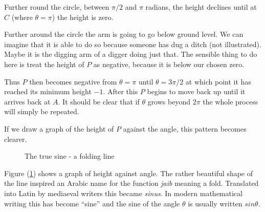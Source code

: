 \documentclass[main.tex]{subfiles}
\begin{document}
Further round the circle, between $\pi/2$ and $\pi$ radians, the height declines until at $C$ (where $\theta=\pi$) the height is zero.

Further around the circle the arm is going to go below ground level. We can imagine that it is able to do so because someone has dug a ditch (not illustrated). Maybe it is the digging arm of a digger doing just that. The sensible thing to do here is treat the height of $P$ as negative, because it is below our chosen zero. 

Thus $P$ then becomes negative from $\theta=\pi$ until $\theta=3\pi/2$ at which point it has reached its minimum height $-1$. After this $P$ begins to move back up until it arrives back at $A$. It should be clear that if $\theta$ grows beyond $2\pi$ the whole process will simply be repeated.

If we draw a graph of the height of $P$ against the angle, this pattern becomes clearer.

\begin{figure}[H]
  \label{fig:sinegraph1}
  \caption{The true sine - a folding line}
  
\end{figure}

Figure (\ref{fig:sinegraph1}) shows a graph of height against angle. The rather beautiful shape of the line inspired an Arabic name for the function {\it jaib} meaning a fold. Translated into Latin by mediaeval writers this became {\it sinus}. In modern mathematical writing this has become ``sine'' and the sine of the angle $\theta$ is usually written $sin \theta$.
\end{document}
